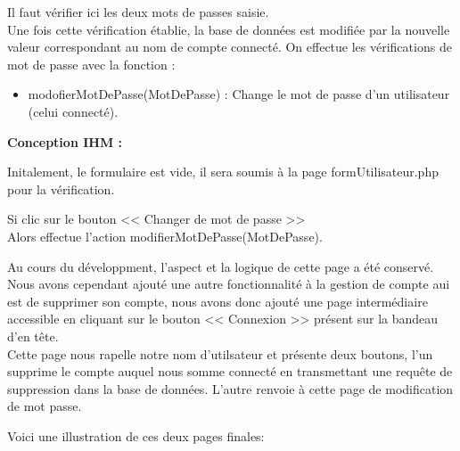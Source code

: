 			\begin{paragraphe}
                Il faut vérifier ici les deux mots de passes saisie.\\
                Une fois cette vérification établie, la base de données est modifiée par la nouvelle valeur correspondant au nom de compte connecté.
				On effectue les vérifications de mot de passe avec la fonction :
				\begin{itemize}
					\item modofierMotDePasse(MotDePasse) : Change le mot de passe d'un utilisateur (celui connecté).
				\end{itemize}
			\end{paragraphe}

			\begin{paragraphe}
				\textbf{Conception IHM :}
			\end{paragraphe}

			\begin{paragraphe}
				Initalement, le formulaire est vide, il sera soumis à la page formUtilisateur.php pour la vérification.
			\end{paragraphe}


			\begin{paragraphe}
				Si clic sur le bouton << Changer de mot de passe >> \\
				Alors effectue l'action modifierMotDePasse(MotDePasse).
			\end{paragraphe}

        \newpage
            \begin{paragraphe}
               Au cours du développment, l'aspect et la logique de cette page a été conservé. Nous avons cependant ajouté une autre fonctionnalité
               à la gestion de compte aui est de supprimer son compte, nous avons donc ajouté une page intermédiaire accessible en cliquant sur le bouton
               << Connexion >> présent sur la bandeau d'en tête.\\
                Cette page nous rapelle notre nom d'utilsateur et présente deux boutons, l'un supprime le compte auquel nous somme connecté en transmettant une requête de suppression dans la
                base de données. L'autre renvoie à cette page de modification de mot passe.
            \end{paragraphe}

            \begin{paragraphe}
                Voici une illustration de ces deux pages finales:
            \end{paragraphe}

